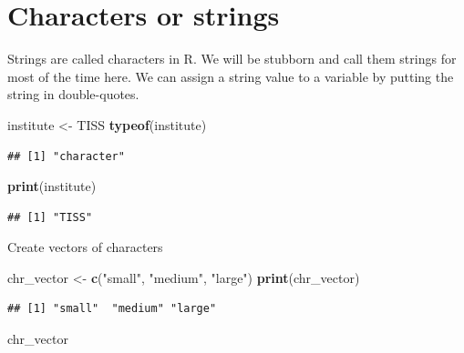 \documentclass[
]{book}
\newenvironment{Shaded}{\begin{snugshade}}{\end{snugshade}}
\newcommand{\FunctionTok}[1]{\textcolor[rgb]{0.13,0.29,0.53}{\textbf{#1}}}
\newcommand{\NormalTok}[1]{#1}
\newcommand{\OtherTok}[1]{\textcolor[rgb]{0.56,0.35,0.01}{#1}}
\newcommand{\StringTok}[1]{\textcolor[rgb]{0.31,0.60,0.02}{#1}}
\begin{document}
\hypertarget{characters-or-strings}{%
\section{Characters or strings}\label{characters-or-strings}}

Strings are called characters in R. We will be stubborn and call them strings for most of the time here. We can assign a string value to a variable by putting the string in double-quotes.

\begin{Shaded}
\begin{Highlighting}[]
\NormalTok{institute }\OtherTok{\textless{}{-}} \StringTok{\textquotesingle{}TISS\textquotesingle{}}
\FunctionTok{typeof}\NormalTok{(institute)}
\end{Highlighting}
\end{Shaded}

\begin{verbatim}
## [1] "character"
\end{verbatim}

\begin{Shaded}
\begin{Highlighting}[]
\FunctionTok{print}\NormalTok{(institute)}
\end{Highlighting}
\end{Shaded}

\begin{verbatim}
## [1] "TISS"
\end{verbatim}

Create vectors of characters

\begin{Shaded}
\begin{Highlighting}[]
\NormalTok{chr\_vector }\OtherTok{\textless{}{-}} \FunctionTok{c}\NormalTok{(}\StringTok{"small"}\NormalTok{, }\StringTok{"medium"}\NormalTok{, }\StringTok{"large"}\NormalTok{)}
\FunctionTok{print}\NormalTok{(chr\_vector)}
\end{Highlighting}
\end{Shaded}

\begin{verbatim}
## [1] "small"  "medium" "large"
\end{verbatim}

\begin{Shaded}
\begin{Highlighting}[]
\NormalTok{chr\_vector}
\end{Highlighting}
\end{Shaded}
\end{document}
